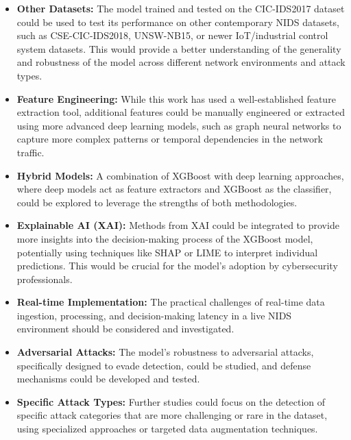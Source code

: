\begin{itemize} 
\item \textbf{Other Datasets: } The model trained and tested on the CIC-IDS2017 dataset could be used to test its performance on other contemporary NIDS datasets, such as CSE-CIC-IDS2018, UNSW-NB15, or newer IoT/industrial control system datasets. This would provide a better understanding of the generality and robustness of the model across different network environments and attack types.
\item \textbf{Feature Engineering: } While this work has used a well-established feature extraction tool, additional features could be manually engineered or extracted using more advanced deep learning models, such as graph neural networks to capture more complex patterns or temporal dependencies in the network traffic.
\item \textbf{Hybrid Models: } A combination of XGBoost with deep learning approaches, where deep models act as feature extractors and XGBoost as the classifier, could be explored to leverage the strengths of both methodologies.
\item \textbf{Explainable AI (XAI): } Methods from XAI could be integrated to provide more insights into the decision-making process of the XGBoost model, potentially using techniques like SHAP or LIME to interpret individual predictions. This would be crucial for the model's adoption by cybersecurity professionals.
\item \textbf{Real-time Implementation: } The practical challenges of real-time data ingestion, processing, and decision-making latency in a live NIDS environment should be considered and investigated.
\item \textbf{Adversarial Attacks: } The model’s robustness to adversarial attacks, specifically designed to evade detection, could be studied, and defense mechanisms could be developed and tested.
\item \textbf{Specific Attack Types: } Further studies could focus on the detection of specific attack categories that are more challenging or rare in the dataset, using specialized approaches or targeted data augmentation techniques.
\end{itemize} 